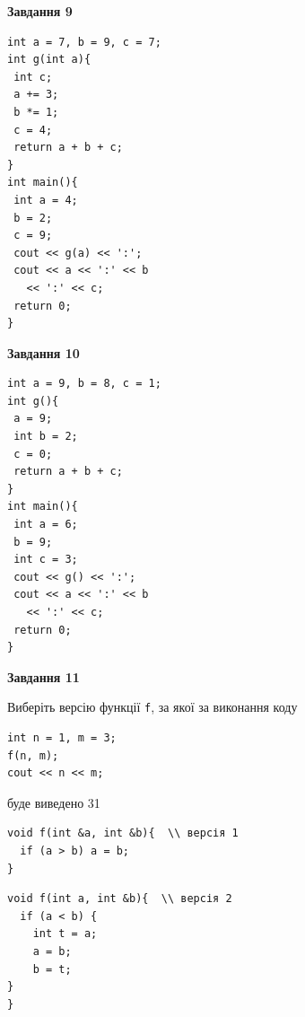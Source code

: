 \documentclass[12pt, ukrainian]{article}
\def\code#1{\Verb!#1!}
\begin{document}
{\begin {large}
\begin{minipage}[t]{11.0cm}
\end{minipage}


\begin{minipage}[t]{7.0cm}

\begin{center}
\textbf{Завдання 9}
\end{center}
\vspace{-8mm}

\begin{verbatim}
int a = 7, b = 9, c = 7;
int g(int a){
 int c;
 a += 3;
 b *= 1;
 c = 4;
 return a + b + c;
}
int main(){
 int a = 4;
 b = 2;
 c = 9;
 cout << g(a) << ':';
 cout << a << ':' << b 
   << ':' << c;
 return 0;
}
\end{verbatim}



\begin{center}
\textbf{Завдання 10}
\end{center}
\vspace{-8mm}

\begin{verbatim}
int a = 9, b = 8, c = 1;
int g(){
 a = 9;
 int b = 2;
 c = 0;
 return a + b + c;
}
int main(){
 int a = 6;
 b = 9;
 int c = 3;
 cout << g() << ':';
 cout << a << ':' << b 
   << ':' << c;
 return 0;
}
\end{verbatim}

\end{minipage}
\vline \hspace{1mm}
\begin{minipage}[t]{11.0cm}

\begin{center}
\textbf{Завдання 11}
\end{center}
Виберіть версію функції \code{f}, за якої за виконання коду
\begin{verbatim}
int n = 1, m = 3;
f(n, m);
cout << n << m;
\end{verbatim}

буде виведено 31

\begin{verbatim}
void f(int &a, int &b){  \\ версія 1
  if (a > b) a = b;
}
\end{verbatim}

\vspace{-8mm}\begin{verbatim}
void f(int a, int &b){  \\ версія 2
  if (a < b) {
    int t = a;
    a = b;
    b = t;
}  
}
\end{verbatim}


\end{minipage}
\end{large}}
\end{document}
